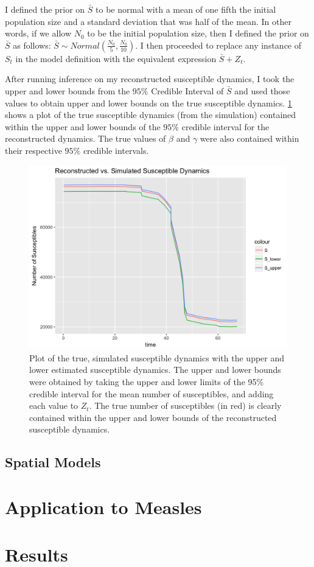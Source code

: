 \documentclass{article}
\begin{document}
I defined the prior on $\bar{S}$ to be normal with a mean of one fifth the initial population size and a standard deviation that was half of the mean. In other words, if we allow $N_{0}$ to be the initial population size, then I defined the prior on $\bar{S}$ as follows: $\bar{S} \sim Normal(\frac{N_{0}}{5}, \frac{N_{0}}{10})$. I then proceeded to replace any instance of $S_{t}$ in the model definition with the equivalent expression $\bar{S} + Z_{t}$. 

After running inference on my reconstructed susceptible dynamics, I took the upper and lower bounds from the $95\%$ Credible Interval of $\bar{S}$ and used those values to obtain upper and lower bounds on the true susceptible dynamics. \ref{fig:SR} shows a plot of the true susceptible dynamics (from the simulation) contained within the upper and lower bounds of the $95\%$ credible interval for the reconstructed dynamics. The true values of $\beta$ and $\gamma$ were also contained within their respective $95\%$ credible intervals. 

\begin{figure}[htbp]
\includegraphics[scale=.25, center]{SRplot.png}
\caption{Plot of the true, simulated susceptible dynamics with the upper and lower estimated susceptible dynamics. The upper and lower bounds were obtained by taking the upper and lower limits of the 95\% credible interval for the mean number of susceptibles, and adding each value to $Z_{t}$. The true number of susceptibles (in red) is clearly contained within the upper and lower bounds of the reconstructed susceptible dynamics.}
\label{fig:SR}
\end{figure}


\subsection{Spatial Models}

\section{Application to Measles}

\section{Results}
\end{document}
